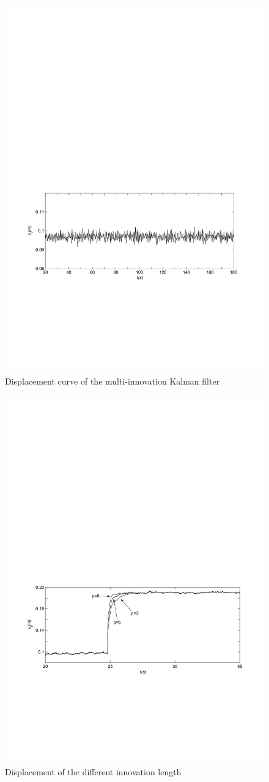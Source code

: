 \documentclass{article}
\begin{document}
\begin{figure}[H]
  \centering
  \includegraphics[width=0.8\hsize]{MATLAB-multi.pdf}
  \caption{Displacement curve of the multi-innovation Kalman filter}
  \label{fig:multi}
\end{figure}

\begin{figure}[H]
  \centering
  \includegraphics[width=0.8\hsize]{MATLAB-innolength0.pdf}
  \caption{Displacement of the different innovation length}
  \label{fig:innolength0}
\end{figure}
\end{document}
